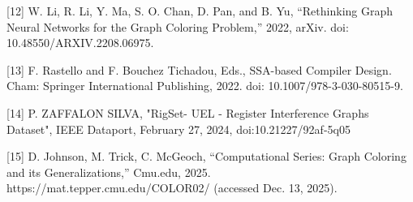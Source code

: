 \documentclass{article}
\begin{document}
{[12] W. Li, R. Li, Y. Ma, S. O. Chan, D. Pan, and B. Yu, “Rethinking Graph Neural Networks for the Graph Coloring Problem,” 2022, arXiv. doi: 10.48550/ARXIV.2208.06975.

[13] F. Rastello and F. Bouchez Tichadou, Eds., SSA-based Compiler Design. Cham: Springer International Publishing, 2022. doi: 10.1007/978-3-030-80515-9.

[14] P. ZAFFALON SILVA, "RigSet- UEL - Register Interference Graphs Dataset", IEEE Dataport, February 27, 2024, doi:10.21227/92af-5q05 
    
[15] D. Johnson, M. Trick, C. McGeoch, “Computational Series: Graph Coloring and its Generalizations,” Cmu.edu, 2025. https://mat.tepper.cmu.edu/COLOR02/ (accessed Dec. 13, 2025).

}
\end{document}
